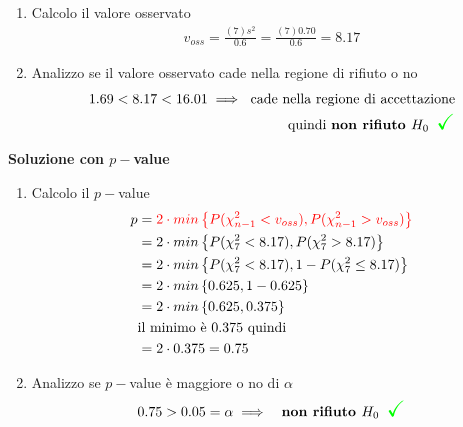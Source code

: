 \documentclass{article}  %
\theoremstyle{definition}
\begin{document}
\begin{esercizio}
\begin{enumerate}
\begin{align*}
			 \mathcal{R}_{\alpha} = \left\{\frac{(7)s^2}{0.6} < \chi^2_{\alpha/2} \right\} \cup \left\{\frac{(7)s^2}{0.6} > \chi^2_{1-\alpha/2} \right\}
		\end{align*}
		\begin{align*}
			 \mathcal{R}_{\alpha} = \left\{\frac{(7)s^2}{0.6} < 1.69 \right\} \cup \left\{\frac{(7)s^2}{0.6} > 16.01 \right\}
		\end{align*}
		\item Calcolo il valore osservato
		\begin{align*}
			v_{oss} = \frac{(7)s^2}{0.6} = \frac{(7)0.70}{0.6} = 8.17
		\end{align*}
		\item Analizzo se il valore osservato cade nella regione di rifiuto o no
		\begin{align*}
			1.69 < 8.17 < 16.01 \implies \text{ cade nella regione di accettazione} \\ \text{ quindi \textbf{non rifiuto $H_0$}} \textcolor{green}{\scalebox{1.6}{ \checkmark}}
		\end{align*}
	\end{enumerate}
	\begin{center}
		\textbf{Soluzione con $p-$value}
	\end{center}
	\begin{enumerate}
		\item Calcolo il $p-$value
		\begin{align*}
			p &= \textcolor{red}{2 \cdot min \left\{P(\chi^2_{n-1} < v_{oss}), P(\chi^2_{n-1} > v_{oss}) \right\}} \\
			&= 2 \cdot min \left\{P(\chi^2_{7} < 8.17), P(\chi^2_{7} > 8.17) \right\} \\
			&= 2 \cdot min \left\{P(\chi^2_{7} < 8.17), 1 - P(\chi^2_{7} \leq 8.17) \right\} \\
			&= 2 \cdot min \left\{0.625, 1 - 0.625 \right\} \\
			&= 2 \cdot min \left\{0.625, 0.375 \right\} \\
			& \text{il minimo è } 0.375 \text{ quindi} \\
			&= 2 \cdot 0.375 = 0.75
		\end{align*}
		\item Analizzo se $p-$value è maggiore o no di $\alpha$
		\begin{align*}
			0.75 > 0.05 = \alpha \implies \text{ \textbf{ non rifiuto $H_0$}} \textcolor{green}{\scalebox{1.6}{ \checkmark}}
		\end{align*}
	\end{enumerate}
\end{esercizio}
\end{document}
